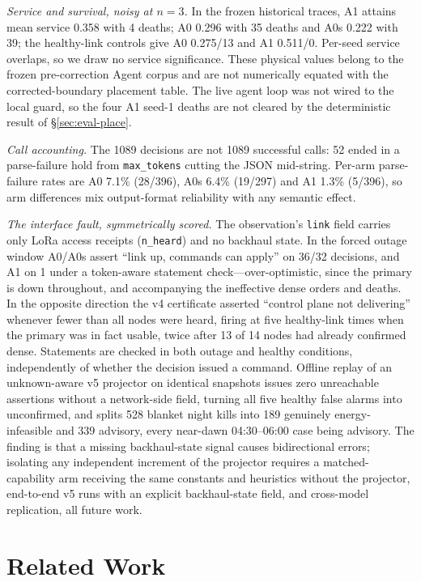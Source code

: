 \documentclass[journal,10pt]{IEEEtran}
\begin{document}
\emph{Service and survival, noisy at $n{=}3$.} In the frozen historical traces, A1 attains mean
service 0.358 with 4 deaths; A0 0.296 with 35 deaths and A0s 0.222 with 39; the
healthy-link controls give A0 0.275/13 and A1 0.511/0. Per-seed service overlaps, so we draw no
service significance. These physical values belong to the frozen pre-correction Agent corpus and
are not numerically equated with the corrected-boundary placement table. The live agent loop was
not wired to the local guard, so the four A1 seed-1 deaths are not cleared by the deterministic
result of \S\ref{sec:eval-place}.

\emph{Call accounting.} The 1089 decisions are not 1089 successful calls: 52 ended in a
parse-failure hold from \texttt{max\_tokens} cutting the JSON mid-string. Per-arm parse-failure rates
are A0 7.1\% (28/396), A0s 6.4\% (19/297) and A1 1.3\% (5/396), so arm differences mix
output-format reliability with any semantic effect.

\emph{The interface fault, symmetrically scored.} The observation's \texttt{link} field carries
only LoRa access receipts (\texttt{n\_heard}) and no backhaul state. In the forced outage window
A0/A0s assert ``link up, commands can apply'' on 36/32 decisions, and A1 on 1 under a
token-aware statement check---over-optimistic, since the primary
is down throughout, and accompanying the ineffective dense orders and deaths. In the opposite
direction the v4 certificate asserted ``control plane not delivering'' whenever fewer than all
nodes were heard, firing at five healthy-link times when the primary was in fact usable, twice
after 13 of 14 nodes had already confirmed dense. Statements are checked in both outage and
healthy conditions, independently of whether the decision issued a command.
Offline replay of an unknown-aware v5 projector on identical snapshots issues zero unreachable
assertions without a network-side field, turning all five healthy false alarms into unconfirmed,
and splits 528 blanket night kills into 189 genuinely energy-infeasible and 339 advisory, every
near-dawn 04:30--06:00 case being advisory. The finding is that a missing backhaul-state
signal causes bidirectional errors; isolating any independent increment of the projector requires a
matched-capability arm receiving the same constants and heuristics without the projector,
end-to-end v5 runs with an explicit backhaul-state field, and cross-model replication, all future
work.

\section{Related Work}
\label{sec:related}
\end{document}
